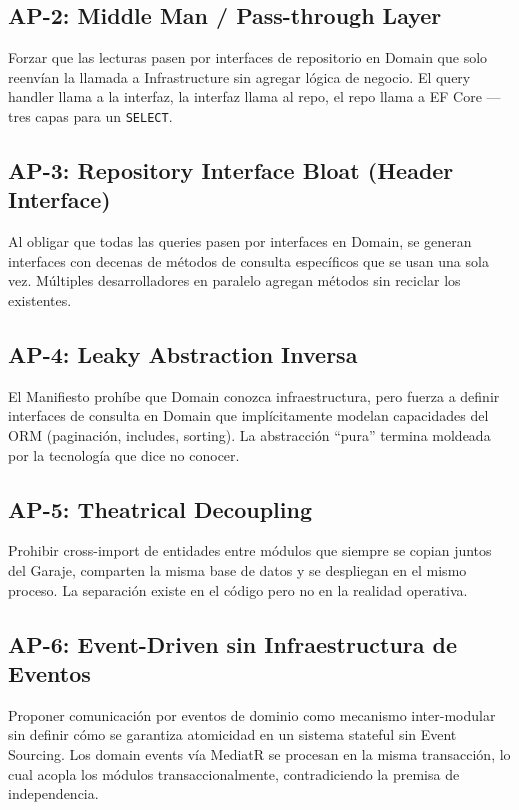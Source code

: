 \documentclass[12pt,a4paper]{article}
\begin{document}
\subsection{AP-2: Middle Man / Pass-through Layer}
Forzar que las lecturas pasen por interfaces de repositorio en Domain que solo reenv\'ian la llamada a Infrastructure sin agregar l\'ogica de negocio. El query handler llama a la interfaz, la interfaz llama al repo, el repo llama a EF Core --- tres capas para un \texttt{SELECT}.

\subsection{AP-3: Repository Interface Bloat (Header Interface)}
Al obligar que todas las queries pasen por interfaces en Domain, se generan interfaces con decenas de m\'etodos de consulta espec\'ificos que se usan una sola vez. M\'ultiples desarrolladores en paralelo agregan m\'etodos sin reciclar los existentes.

\subsection{AP-4: Leaky Abstraction Inversa}
El Manifiesto proh\'ibe que Domain conozca infraestructura, pero fuerza a definir interfaces de consulta en Domain que impl\'icitamente modelan capacidades del ORM (paginaci\'on, includes, sorting). La abstracci\'on ``pura'' termina moldeada por la tecnolog\'ia que dice no conocer.

\subsection{AP-5: Theatrical Decoupling}
Prohibir cross-import de entidades entre m\'odulos que siempre se copian juntos del Garaje, comparten la misma base de datos y se despliegan en el mismo proceso. La separaci\'on existe en el c\'odigo pero no en la realidad operativa.

\subsection{AP-6: Event-Driven sin Infraestructura de Eventos}
Proponer comunicaci\'on por eventos de dominio como mecanismo inter-modular sin definir c\'omo se garantiza atomicidad en un sistema stateful sin Event Sourcing. Los domain events v\'ia MediatR se procesan en la misma transacci\'on, lo cual acopla los m\'odulos transaccionalmente, contradiciendo la premisa de independencia.
\end{document}
